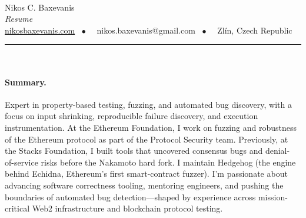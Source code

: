 \documentclass[10pt]{article}
\begin{document}
\thispagestyle{empty}

\begin{center}
~\\[3mm]
{\Huge Nikos C. Baxevanis} \\[5.5mm]
{\large \emph{Resume}} \\[5.5mm]
\href{https://nikosbaxevanis.com}{nikosbaxevanis.com} ~$\bullet$~~
nikos.baxevanis@gmail.com ~$\bullet$~~ Zl\'in, Czech Republic \\[5mm]
\hrule
~\\[6mm]
\end{center}

\paragraph{Summary.}
Expert in property-based testing, fuzzing, and automated bug discovery, with a
focus on input shrinking, reproducible failure discovery, and execution
instrumentation. At the Ethereum Foundation, I work on fuzzing and robustness
of the Ethereum protocol as part of the Protocol Security team. Previously, at
the Stacks Foundation, I built tools that uncovered consensus bugs and denial-
of-service risks before the Nakamoto hard fork. I maintain Hedgehog (the engine
behind Echidna, Ethereum’s first smart-contract fuzzer). I’m passionate about
advancing software correctness tooling, mentoring engineers, and pushing the
boundaries of automated bug detection—shaped by experience across
mission-critical Web2 infrastructure and blockchain protocol testing.
\end{document}
